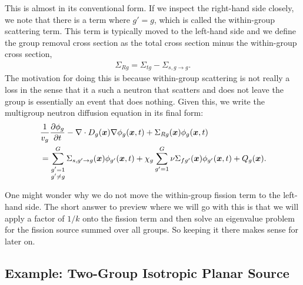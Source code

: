This is almost in its conventional form. If we inspect the right-hand side closely, we note that there is a term where $g' = g$, which is called the within-group scattering term. This term is typically moved to the left-hand side and we define the group removal cross section as the total cross section minus the within-group cross section,
\begin{align}
  \Sigma_{Rg} = \Sigma_{tg} - \Sigma_{s,g \rightarrow g} .
\end{align}
The motivation for doing this is because within-group scattering is not really a loss in the sense that it a such a neutron that scatters and does not leave the group is essentially an event that does nothing. Given this, we write the multigroup neutron diffusion equation in its final form:
\begin{align}
  &\frac{1}{v_g} \frac{ \partial {\phi_g} }{ \partial {t} } - \nabla \cdot D_g(\bm{x}) \nabla \phi_g(\bm{x},t) + \Sigma_{Rg}(\bm{x}) \phi_g(\bm{x},t) \nonumber \\*
  &= \sum_{\substack{g' =1 \\ g' \ne g}}^G  \Sigma_{s,g' \rightarrow g}(\bm{x}) \phi_{g'}(\bm{x},t) + \chi_g \sum_{g'=1}^G   \nu\Sigma_{fg'}(\bm{x}) \phi_{g'}(\bm{x},t) + Q_{g}(\bm{x}) .
\end{align}

One might wonder why we do not move the within-group fission term to the left-hand side. The short answer to preview where we will go with this is that we will apply a factor of $1/k$ onto the fission term and then solve an eigenvalue problem for the fission source summed over all groups. So keeping it there makes sense for later on.

\subsection{Example: Two-Group Isotropic Planar Source}

